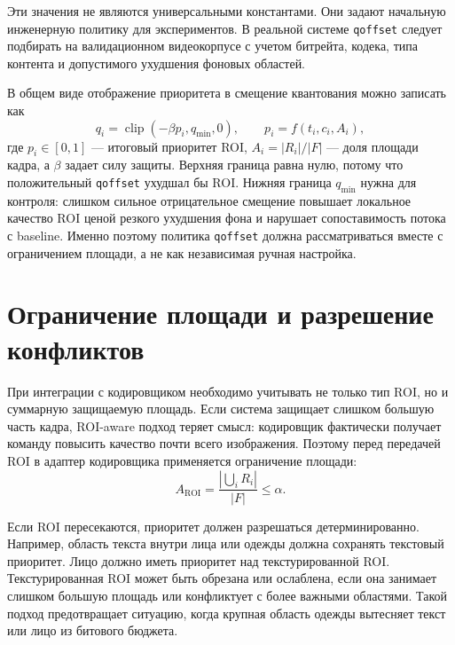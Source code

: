\documentclass[12pt,a4paper,oneside,openany]{report}
\newcommand{\roi}{\mathrm{ROI}}
\begin{document}
Эти значения не являются универсальными константами. Они задают начальную инженерную политику
для экспериментов. В реальной системе \texttt{qoffset} следует подбирать на валидационном
видеокорпусе с учетом битрейта, кодека, типа контента и допустимого ухудшения фоновых областей.

В общем виде отображение приоритета в смещение квантования можно записать как
\begin{equation}
  q_i = \operatorname{clip}(-\beta p_i, q_{\min}, 0),
  \qquad
  p_i = f(t_i,c_i,A_i),
  \label{eq:qoffset_mapping}
\end{equation}
где $p_i\in[0,1]$ --- итоговый приоритет ROI, $A_i=|R_i|/|F|$ --- доля площади кадра, а
$\beta$ задает силу защиты. Верхняя граница равна нулю, потому что положительный \texttt{qoffset}
ухудшал бы ROI. Нижняя граница $q_{\min}$ нужна для контроля: слишком сильное отрицательное
смещение повышает локальное качество ROI ценой резкого ухудшения фона и нарушает сопоставимость
потока с baseline.
Именно поэтому политика \texttt{qoffset} должна рассматриваться вместе с ограничением площади,
а не как независимая ручная настройка.


\section{Ограничение площади и разрешение конфликтов}

При интеграции с кодировщиком необходимо учитывать не только тип ROI, но и суммарную защищаемую
площадь. Если система защищает слишком большую часть кадра, ROI-aware подход теряет смысл:
кодировщик фактически получает команду повысить качество почти всего изображения. Поэтому перед
передачей ROI в адаптер кодировщика применяется ограничение площади:
\begin{equation}
  A_{\roi} = \frac{\left|\bigcup_i R_i\right|}{|F|}\leq \alpha.
  \label{eq:encoder_area_cap}
\end{equation}

Если ROI пересекаются, приоритет должен разрешаться детерминированно. Например, область текста
внутри лица или одежды должна сохранять текстовый приоритет. Лицо должно иметь приоритет над
текстурированной ROI. Текстурированная ROI может быть обрезана или ослаблена, если она занимает
слишком большую площадь или конфликтует с более важными областями. Такой подход предотвращает
ситуацию, когда крупная область одежды вытесняет текст или лицо из битового бюджета.
\end{document}

